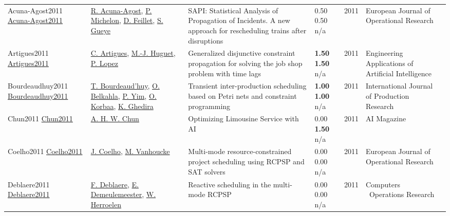 {\begin{longtable}{p{3cm}p{5cm}p{10cm}p{1cm}rp{2.5cm}l}
Acuna-Agost2011 \href{http://dx.doi.org/10.1016/j.ejor.2011.05.047}{Acuna-Agost2011} & \hyperref[auth:a354]{R. Acuna-Agost}, \hyperref[auth:a355]{P. Michelon}, \hyperref[auth:a356]{D. Feillet}, \hyperref[auth:a357]{S. Gueye} & SAPI: Statistical Analysis of Propagation of Incidents. A new approach for rescheduling trains after disruptions & \noindent{}0.50 0.50 n/a & 2011 & European Journal of Operational Research & \cite{Acuna-Agost2011}\\
Artigues2011 \href{http://dx.doi.org/10.1016/j.engappai.2010.07.008}{Artigues2011} & \hyperref[auth:a6]{C. Artigues}, \hyperref[auth:a1199]{M.-J. Huguet}, \hyperref[auth:a3]{P. Lopez} & \cellcolor{green!10}Generalized disjunctive constraint propagation for solving the job shop problem with time lags & \noindent{}\textbf{1.50} \textbf{1.50} n/a & 2011 & Engineering Applications of Artificial Intelligence & \cite{Artigues2011}\\
Bourdeaudhuy2011 \href{http://dx.doi.org/10.1080/00207543.2010.519113}{Bourdeaudhuy2011} & \hyperref[auth:a1650]{T. Bourdeaud'huy}, \hyperref[auth:a1651]{O. Belkahla}, \hyperref[auth:a681]{P. Yim}, \hyperref[auth:a680]{O. Korbaa}, \hyperref[auth:a1652]{K. Ghedira} & Transient inter-production scheduling based on Petri nets and constraint programming & \noindent{}\textbf{1.00} \textbf{1.00} n/a & 2011 & \cellcolor{red!20}International Journal of Production Research & \cite{Bourdeaudhuy2011}\\
Chun2011 \href{http://dx.doi.org/10.1609/aimag.v32i2.2346}{Chun2011} & \hyperref[auth:a1322]{A. H. W. Chun} & \cellcolor{gold!20}Optimizing Limousine Service with AI & \noindent{}\textcolor{black!50}{0.00} \textbf{1.50} n/a & 2011 & AI Magazine & \cite{Chun2011}\\
Coelho2011 \href{http://dx.doi.org/10.1016/j.ejor.2011.03.019}{Coelho2011} & \hyperref[auth:a1555]{J. Coelho}, \hyperref[auth:a1556]{M. Vanhoucke} & \cellcolor{green!10}Multi-mode resource-constrained project scheduling using RCPSP and SAT solvers & \noindent{}\textcolor{black!50}{0.00} \textcolor{black!50}{0.00} n/a & 2011 & European Journal of Operational Research & \cite{Coelho2011}\\
Deblaere2011 \href{http://dx.doi.org/10.1016/j.cor.2010.01.001}{Deblaere2011} & \hyperref[auth:a1775]{F. Deblaere}, \hyperref[auth:a1090]{E. Demeulemeester}, \hyperref[auth:a1102]{W. Herroelen} & Reactive scheduling in the multi-mode RCPSP & \noindent{}\textcolor{black!50}{0.00} \textcolor{black!50}{0.00} n/a & 2011 & Computers \  Operations Research & \cite{Deblaere2011}\\

\end{longtable}}

